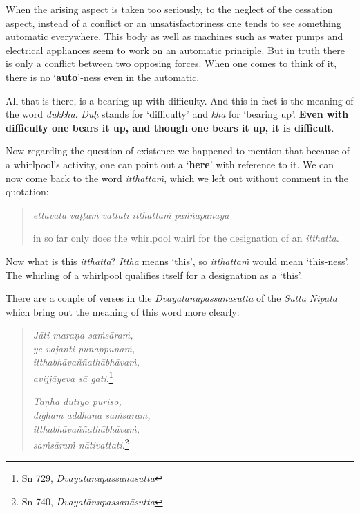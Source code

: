 When the arising aspect is taken too seriously, to the neglect of the cessation aspect, instead of a conflict or an unsatisfactoriness one tends to see something automatic everywhere. This body as well as machines such as water pumps and electrical appliances seem to work on an automatic principle. But in truth there is only a conflict between two opposing forces. When one comes to think of it, there is no `\textbf{auto}'-ness even in the automatic.

All that is there, is a bearing up with difficulty. And this in fact is the meaning of the word \emph{dukkha}. \emph{Duḥ} stands for `difficulty' and \emph{kha} for `bearing up'. \textbf{Even with difficulty one bears it up, and though one bears it up, it is difficult}.

Now regarding the question of existence we happened to mention that because of a whirlpool's activity, one can point out a `\textbf{here}' with reference to it. We can now come back to the word \emph{itthattaṁ}, which we left out without comment in the quotation:

\begin{quote}
\emph{ettāvatā vaṭṭaṁ vattati itthattaṁ paññāpanāya}

in so far only does the whirlpool whirl for the designation of an \emph{itthatta.}
\end{quote}

Now what is this \emph{itthatta}? \emph{Ittha} means `this', so \emph{itthattaṁ} would mean `this-ness'. The whirling of a whirlpool qualifies itself for a designation as a `this'.

There are a couple of verses in the \emph{Dvayatānupassanāsutta} of the \emph{Sutta Nipāta} which bring out the meaning of this word more clearly:

\begin{quote}
\emph{Jāti maraṇa saṁsāraṁ,}\\
\emph{ye vajanti punappunaṁ,}\\
\emph{itthabhāvaññathābhāvaṁ,}\\
\emph{avijjāyeva sā gati}.\footnote{Sn 729, \emph{Dvayatānupassanāsutta}}

\emph{Taṇhā dutiyo puriso,}\\
\emph{dīgham addhāna saṁsāraṁ,}\\
\emph{itthabhāvaññathābhāvaṁ,}\\
\emph{saṁsāraṁ nātivattati}.\footnote{Sn 740, \emph{Dvayatānupassanāsutta}}
\end{quote}

